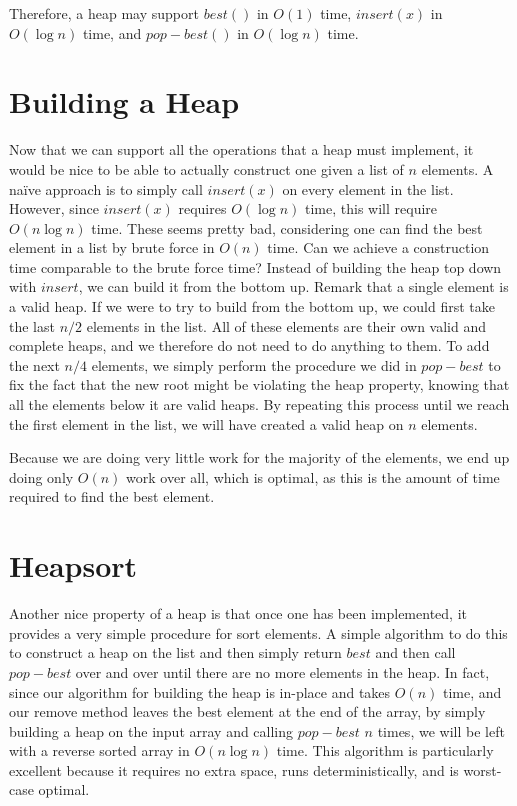 Therefore, a heap may support $best()$ in $O(1)$ time, $insert(x)$ 
in $O(\log n)$ time, and $pop-best()$ in $O(\log n)$ time.

\section{Building a Heap}

Now that we can support all the operations that a heap must implement,
it would be nice to be able to actually construct one given a list of $n$
elements. A na\"ive approach is to simply call $insert(x)$ on every element
in the list. However, since $insert(x)$ requires $O(\log n)$ time, this will
require $O(n \log n)$ time. These seems pretty bad, considering one can find
the best element in a list by brute force in $O(n)$ time. Can we achieve a
construction time comparable to the brute force time?
Instead of building the heap top down with $insert$, we can build it from the
bottom up. Remark that a single element is a valid heap. If we were to try to
build from the bottom up, we could first take the last $n/2$ elements in the
list. All of these elements are their own valid and complete heaps,
and we therefore do not need to do anything to them.
To add the next $n/4$ elements, we simply perform
the procedure we did in $pop-best$ to fix the fact that the new root might
be violating the heap property, knowing that all the elements below it are
valid heaps. By repeating this process until we reach the first element in
the list, we will have created a valid heap on $n$ elements.

Because we are doing very little work for the majority of the elements, we end
up doing only $O(n)$ work over all, which is optimal, as this is the amount of
time required to find the best element.

\section{Heapsort}

Another nice property of a heap is that once one has been implemented,
it provides a very simple procedure for sort elements.
A simple algorithm to do this to construct a heap on the list and then simply
return $best$ and then call $pop-best$ over and over until there are no more
elements in the heap.
In fact, since our algorithm for building the heap is in-place and takes $O(n)$
time, and our remove method leaves the best element at the end of the array,
by simply building a heap on the input array and calling $pop-best$ $n$ times,
we will be left with a reverse sorted array in $O(n \log n)$ time. 
This algorithm is particularly excellent because it requires no extra space,
runs deterministically, and is worst-case optimal.

